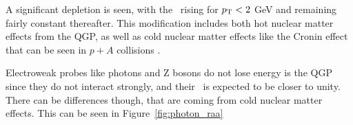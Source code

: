 A significant depletion is seen, with the \RAA\ rising for $\mbox{$p_{\mathrm{T}}$} < 2$ GeV and remaining fairly constant thereafter.
This modification includes both hot nuclear matter effects from the QGP, as well as cold nuclear matter effects like the Cronin effect that can be seen in $p+A$ collisions \cite{PhysRevD.19.764}.

Electroweak probes like photons and Z bosons do not lose energy is the QGP since they do not interact strongly, and their \RAA\ is expected to be closer to unity.
There can be differences though, that are coming from cold nuclear matter effects.
This can be seen in Figure~\ref{fig:photon_raa}